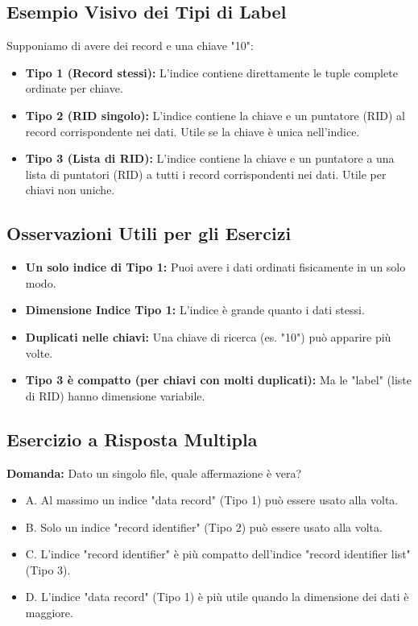 \subsection{Esempio Visivo dei Tipi di Label}
Supponiamo di avere dei record e una chiave "10":
\begin{itemize}
    \item \textbf{Tipo 1 (Record stessi):} L'indice contiene direttamente le tuple complete ordinate per chiave.
    \item \textbf{Tipo 2 (RID singolo):} L'indice contiene la chiave e un puntatore (RID) al record corrispondente nei dati. Utile se la chiave è unica nell'indice.
    \item \textbf{Tipo 3 (Lista di RID):} L'indice contiene la chiave e un puntatore a una lista di puntatori (RID) a tutti i record corrispondenti nei dati. Utile per chiavi non uniche.
\end{itemize}

\subsection{Osservazioni Utili per gli Esercizi}
\begin{itemize}
    \item \textbf{Un solo indice di Tipo 1:} Puoi avere i dati ordinati fisicamente in un solo modo.
    \item \textbf{Dimensione Indice Tipo 1:} L'indice è grande quanto i dati stessi.
    \item \textbf{Duplicati nelle chiavi:} Una chiave di ricerca (es. "10") può apparire più volte.
    \item \textbf{Tipo 3 è compatto (per chiavi con molti duplicati):} Ma le "label" (liste di RID) hanno dimensione variabile.
\end{itemize}

\subsection{Esercizio a Risposta Multipla}
\textbf{Domanda:} Dato un singolo file, quale affermazione è vera?
\begin{itemize}
    \item A. Al massimo un indice "data record" (Tipo 1) può essere usato alla volta.
    \item B. Solo un indice "record identifier" (Tipo 2) può essere usato alla volta.
    \item C. L'indice "record identifier" è più compatto dell'indice "record identifier list" (Tipo 3).
    \item D. L'indice "data record" (Tipo 1) è più utile quando la dimensione dei dati è maggiore.
\end{itemize}

